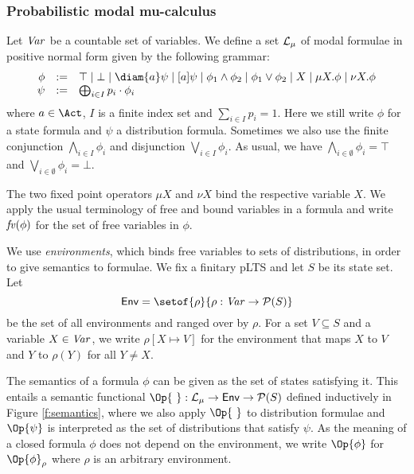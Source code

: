 \documentclass{article}
\def \CL{{\cal L}}
\def \Var{{\it Var}}
\def \fv{{\it fv}}
\def \Pow#1{\mathcal P(#1)}
\newcommand{\Env}{{\sf Env}}
\newcommand{\boxm}[1]{[#1]}
\begin{document}
\subsubsection{Probabilistic modal mu-calculus} Let $\Var$ be a
countable set of variables.
We define a  set $\CL_\mu$ of modal formulae in positive normal form
given by the following grammar:
\[\begin{array}{rcl}
\phi & := &  \top\mid \bot \mid\diam{a}\psi \mid \boxm{a}\psi \mid \phi_1\wedge\phi_2 \mid \phi_1\vee\phi_2 \mid X \mid \mu X.\phi \mid \nu X.\phi\\
\psi & := & \bigoplus_{i\in I}p_i\cdot\phi_i\end{array}\]  where
$a\in\Act$, $I$ is a finite index set and $\sum_{i\in I}p_i=1$. Here
we still write $\phi$ for a state formula and $\psi$ a distribution
formula. Sometimes we also use the finite conjunction
$\bigwedge_{i\in I}\phi_i$ and disjunction $\bigvee_{i\in I}\phi_i$.
As usual, we have $\bigwedge_{i\in\emptyset}\phi_i=\top$ and
$\bigvee_{i\in \emptyset}\phi_i=\bot$.

The two fixed point operators $\mu X$ and $\nu X$ bind the
respective variable $X$. We apply the usual terminology of free and
bound variables in a formula and write $\fv(\phi)$ for the set of
free variables in $\phi$.

We use {\em environments}, which binds free variables to sets of
distributions, in order to give semantics to formulae. We fix a
finitary pLTS and let $S$ be its state set. Let
\[\Env=\setof{\rho}{\rho:\Var\rightarrow\Pow{S}}\] be the set of
all environments and ranged over by $\rho$. For a set $V\subseteq S$
and a variable $X\in\Var$, we write $\rho[X\mapsto V]$ for the
environment that maps $X$ to $V$ and $Y$ to $\rho(Y)$ for all
$Y\not=X$.

The semantics of a formula $\phi$ can be given as the set of states
satisfying it. This entails a semantic functional $\Op{\ }:\CL_\mu
\rightarrow \Env \rightarrow \Pow{S}$ defined inductively in Figure
\ref{f:semantics}, where we also apply $\Op{\ }$ to distribution
formulae and $\Op{\psi}$ is interpreted as the set of distributions
that satisfy $\psi$. As the meaning of a closed formula $\phi$ does
not depend on the environment, we write $\Op{\phi}$ for
$\Op{\phi}_\rho$ where $\rho$ is an arbitrary environment.
\end{document}
